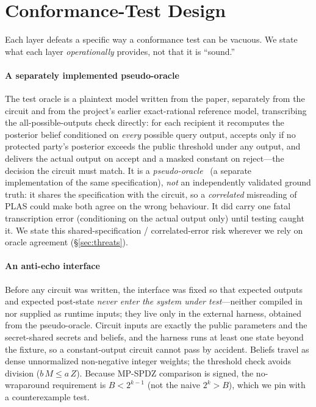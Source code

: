 \documentclass[conference]{IEEEtran}
\begin{document}
\section{Conformance-Test Design}
\label{sec:method}
Each layer defeats a specific way a conformance test can be vacuous. We state what each
layer \emph{operationally} provides, not that it is ``sound.''

\paragraph{A separately implemented pseudo-oracle}
The test oracle is a plaintext model written from the paper, separately from the circuit
and from the project's earlier exact-rational reference model, transcribing the
all-possible-outputs check directly: for each recipient it recomputes the posterior belief
conditioned on \emph{every} possible query output, accepts only if no protected party's
posterior exceeds the public threshold under any output, and delivers the actual output on
accept and a masked constant on reject---the decision the circuit must match. It is a
\emph{pseudo-oracle}~\cite{oracleproblem} (a
separate implementation of the same specification), \emph{not} an independently validated
ground truth: it shares the specification with the circuit, so a \emph{correlated}
misreading of PLAS could make both agree on the wrong behaviour. It did carry one fatal
transcription error (conditioning on the actual output only) until testing caught it. We
state this shared-specification / correlated-error risk wherever we rely on oracle
agreement (\S\ref{sec:threats}).

\paragraph{An anti-echo interface}
Before any circuit was written, the interface was fixed so that expected outputs and
expected post-state \emph{never enter the system under test}---neither compiled in nor
supplied as runtime inputs; they live only in the external harness, obtained from the
pseudo-oracle. Circuit inputs are exactly the public parameters and the secret-shared
secrets and beliefs, and the harness runs at least one state beyond the fixture, so a
constant-output circuit cannot pass by accident. Beliefs travel as dense unnormalized
non-negative integer weights; the threshold check avoids division ($b\,M \le a\,Z$).
Because MP-SPDZ comparison is signed, the no-wraparound requirement is $B < 2^{k-1}$ (not
the naive $2^k > B$), which we pin with a counterexample test.
\end{document}
